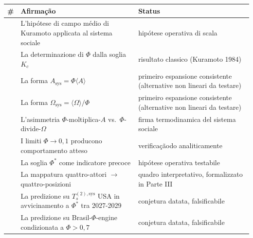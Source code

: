 {\def\LTcaptype{none} %
{\small\begin{longtable}[]{@{}
  >{\raggedright\arraybackslash}p{}
  >{\raggedright\arraybackslash}p{}
  >{\raggedright\arraybackslash}p{}@{}}
\toprule\noalign{}
\begin{minipage}[b]{\linewidth}\raggedright
\#
\end{minipage} & \begin{minipage}[b]{\linewidth}\raggedright
Afirmação
\end{minipage} & \begin{minipage}[b]{\linewidth}\raggedright
Status
\end{minipage} \\
\midrule\noalign{}
\endhead
\bottomrule\noalign{}
\endlastfoot
1 & L'hipótese di campo médio di Kuramoto applicata al sistema sociale &
\Hypoth{} hipótese operativa di scala \\
2 & La determinazione di \(\Phi\) dalla soglia \(K_c\) & \Proved{}
risultato classico (Kuramoto 1984) \\
3 & La forma \(A_{\text{sys}} = \Phi \langle A\rangle\) & \Hypoth{}
primeiro espansione consistente (alternative non lineari da testare) \\
4 & La forma \(\Omega_{\text{sys}} = \langle\Omega\rangle/\Phi\) &
\Hypoth{} primeiro espansione consistente (alternative non lineari da
testare) \\
5 & L'asimmetria \(\Phi\)-moltiplica-\(A\)
vs.~\(\Phi\)-divide-\(\Omega\) & \Hypoth{} firma termodinamica del
sistema sociale \\
6 & I limiti \(\Phi \to 0, 1\) producono comportamento atteso &
\Proved{} verificaçãodo analiticamente \\
7 & La soglia \(\Phi^*\) come indicatore precoce & \Hypoth{} hipótese
operativa testabile \\
8 & La mappatura quattro-attori $\to$ quattro-posizioni & \Hypoth{} quadro
interpretativo, formalizzato in Parte III \\
9 & La predizione su \(T_s^{(2),\text{sys}}\) USA in avvicinamento a
\(\Phi^*\) tra 2027-2029 & \Conj{} conjetura datata, falsificabile \\
10 & La predizione su Brasil-$\Phi$-engine condizionata a \(\Phi > 0{,}7\) &
\Conj{} conjetura datata, falsificabile \\
\end{longtable}}
}



